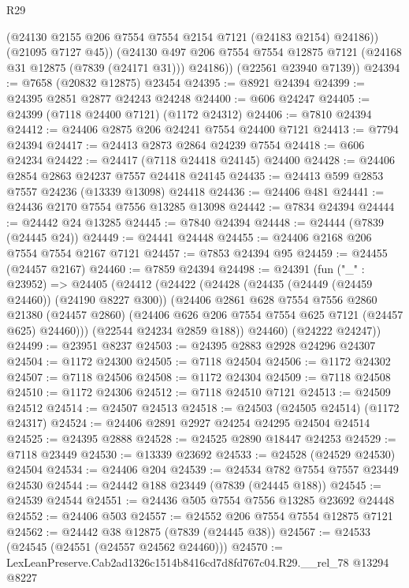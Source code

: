 \begin{lexlean}{R29}
\begin{coremodule}
            (@24130 @2155 @206 @7554 @7554 @2154 @7121 (@24183 @2154) @24186))
          (@21095 @7127 @45))
        (@24130 @497 @206 @7554 @7554 @12875 @7121 (@24168 @31 @12875 (@7839 (@24171 @31))) @24186))
      (@22561 @23940 @7139))
@24394 := @7658 (@20832 @12875) @23454
@24395 := @8921 @24394
@24399 := @24395 @2851 @2877 @24243 @24248
@24400 := @606 @24247
@24405 := @24399 (@7118 @24400 @7121) (@1172 @24312)
@24406 := @7810 @24394
@24412 := @24406 @2875 @206 @24241 @7554 @24400 @7121
@24413 := @7794 @24394
@24417 := @24413 @2873 @2864 @24239 @7554
@24418 := @606 @24234
@24422 := @24417 (@7118 @24418 @24145) @24400
@24428 := @24406 @2854 @2863 @24237 @7557 @24418 @24145
@24435 := @24413 @599 @2853 @7557 @24236 (@13339 @13098) @24418
@24436 := @24406 @481
@24441 := @24436 @2170 @7554 @7556 @13285 @13098
@24442 := @7834 @24394
@24444 := @24442 @24 @13285
@24445 := @7840 @24394
@24448 := @24444 (@7839 (@24445 @24))
@24449 := @24441 @24448
@24455 := @24406 @2168 @206 @7554 @7554 @2167 @7121
@24457 := @7853 @24394 @95
@24459 := @24455 (@24457 @2167)
@24460 := @7859 @24394
@24498 := @24391
    (fun ("_" : @23952) =>
    @24405
      (@24412
        (@24422
          (@24428
            (@24435 (@24449 (@24459 @24460)) (@24190 @8227 @300))
            (@24406
              @2861
              @628
              @7554
              @7556
              @2860
              @21380
              (@24457 @2860)
              (@24406 @626 @206 @7554 @7554 @625 @7121 (@24457 @625) @24460)))
          (@22544 @24234 @2859 @188))
        @24460)
      (@24222 @24247))
@24499 := @23951 @8237
@24503 := @24395 @2883 @2928 @24296 @24307
@24504 := @1172 @24300
@24505 := @7118 @24504
@24506 := @1172 @24302
@24507 := @7118 @24506
@24508 := @1172 @24304
@24509 := @7118 @24508
@24510 := @1172 @24306
@24512 := @7118 @24510 @7121
@24513 := @24509 @24512
@24514 := @24507 @24513
@24518 := @24503 (@24505 @24514) (@1172 @24317)
@24524 := @24406 @2891 @2927 @24254 @24295 @24504 @24514
@24525 := @24395 @2888
@24528 := @24525 @2890 @18447 @24253
@24529 := @7118 @23449
@24530 := @13339 @23692
@24533 := @24528 (@24529 @24530) @24504
@24534 := @24406 @204
@24539 := @24534 @782 @7554 @7557 @23449 @24530
@24544 := @24442 @188 @23449 (@7839 (@24445 @188))
@24545 := @24539 @24544
@24551 := @24436 @505 @7554 @7556 @13285 @23692 @24448
@24552 := @24406 @503
@24557 := @24552 @206 @7554 @7554 @12875 @7121
@24562 := @24442 @38 @12875 (@7839 (@24445 @38))
@24567 := @24533 (@24545 (@24551 (@24557 @24562 @24460)))
@24570 := LexLeanPreserve.Cab2ad1326c1514b8416cd7d8fd767c04.R29.__rel_78 @13294 @8227

\end{coremodule}
\end{lexlean}
